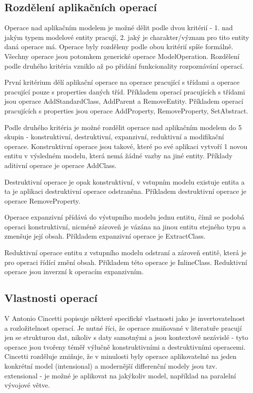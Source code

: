 \documentclass[11pt,twoside,a4paper]{book}
\begin{document}
\subsection {Rozdělení aplikačních operací} 

Operace nad aplikačním modelem je možné dělit podle dvou kritérií - 1. nad jakým
typem modelové entity pracují, 2. jaký je charakter/význam pro tito entity daná
operace má. Operace byly rozděleny podle obou kritérií spíše formálně. Všechny operace
jsou potomkem generické operace ModelOperation. Rozdělení podle druhého kritéria
vzniklo až po přidání funkcionality rozpoznávání operací.

První kritérium dělí aplikační operace na operace pracující s třídami a operace
pracující pouze s properties daných tříd. Příkladem operací pracujících s
třídami jsou operace AddStandardClass, AddParent a RemoveEntity. Příkladem
operací pracujících s properties jsou operace AddProperty, RemoveProperty,
SetAbstract.

Podle druhého kritéria je možné rozdělit operace nad aplikačním modelem do 5
skupin - konstruktivní, destruktivní, expanzivní, reduktivní a modifikační operace.
Konstruktivní operace jsou takové, které po své aplikaci vytvoří 1 novou entitu
v výsledném modelu, která nemá žádné vazby na jiné entity. Příklady aditivní
operace je operace AddClass. 

Destruktivní operace je opak konstruktivní, v vstupním modelu existuje entita a
ta je aplikaci destruktivní operace odstraněna. Příkladem destruktivní operace
je operace RemoveProperty.

Operace expanzivní přídává do výstupního modelu jednu entitu, čímž se
podobá operaci konstruktivní, nicméně zároveň je vázána na jinou entitu
stejného typu a zmenšuje její obsah. Příkladem expanzivní operace je
ExtractClass.

Reduktivní operace entitu z vstupního modelu odstraní a zároveň entitě, která
je pro operaci řídící změní obsah. Příkladem této operace je InlineClass.
Reduktivní operace jsou inverzní k operacím expanzivním.\\

\subsection{Vlastnosti operací}
V \cite{Cincetti} Antonio Cincetti popisuje některé specifické vlastnosti
jako je invertovatelnost a rozložitelnost operací. Je nutné říci, že operace
zmiňované v literatuře pracují jen se strukturou dat, nikoliv s daty samotnými
a jsou kontextově nezávislé - tyto operace jsou tvořeny téměř výlučně
konstruktivními a  destruktivními operacemi. Cincetti rozděluje zmiňuje, že v
minulosti byly operace aplikovatelné na jeden konkrétní model (intensional) a
modernější differenční modely jsou tzv. extensional - je možné je aplikovat na
jakýkoliv model, například na paralelní vývojové větve.
\end{document}

